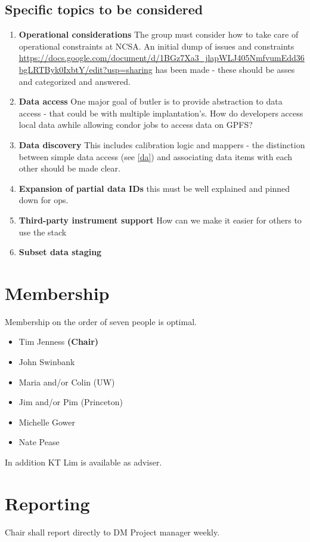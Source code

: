 \subsection{Specific topics to be considered}

\begin{enumerate}
\item {\bf  Operational considerations}
The group must consider how to take care of operational constraints at NCSA.
An initial dump of issues and constraints \url{https://docs.google.com/document/d/1BGz7Xa3_jlapWLJ405NmfvumEdd36bgLRTByk0IxbtY/edit?usp=sharing} has been made - these should be asses and categorized and answered.

\item {\bf  Data access}\label{da}
One major goal  of butler is to provide abstraction to data access - that could be with multiple implantation's.
How do developers access local data awhile allowing condor jobs to access data on GPFS?

\item {\bf  Data discovery}
This includes  calibration logic and mappers - the distinction between simple data access (see \ref{da}) and associating data items with each other should be made clear.

\item {\bf  Expansion of partial data IDs } this must be well explained and pinned down for ops.

\item {\bf Third-party instrument support}  How can we make it easier for others to use the stack
\item {\bf  Subset data staging}
\end{enumerate}

\section{Membership}
Membership on the order of seven people is optimal.
\begin{itemize}
        \item Tim Jenness {\bf(Chair)}
\item  John Swinbank
\item   Maria and/or Colin (UW)
\item   Jim and/or Pim (Princeton)
\item   Michelle Gower
\item   Nate Pease
\end{itemize}
In addition KT Lim is available as adviser.

\section{ Reporting}
           Chair shall report directly to  DM Project manager weekly.

